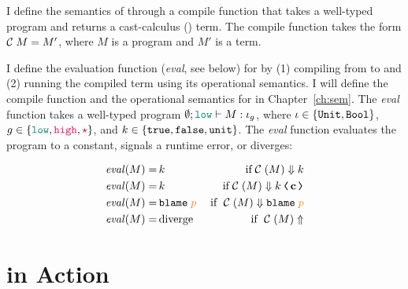 
I define the semantics of \Surface through a compile function that takes a
well-typed \Surface program and returns a cast-calculus (\CC) term. The compile
function takes the form $\mathcal{C}\;{M} = M'$, where $M$ is a \Surface program and
$M'$ is a \CC term.

I define the evaluation function (\textit{eval}, see below) for \Surface by (1)
compiling from \Surface to \CC and (2) running the compiled \CC term using its
operational semantics. I will define the compile function and the operational
semantics for \CC in Chapter~\ref{ch:sem}. The \textit{eval} function takes a
well-typed \Surface program $\emptyset ; \low \vdash M : \iota_g$, where $\iota
\in \{\mathtt{Unit}, \mathtt{Bool}\}$, $g \in \{\low, \high, \unk\}$, and $k \in \{\mathtt{true},
\mathtt{false}, \mathtt{unit}\}$. The \textit{eval} function evaluates the program to a
constant, signals a runtime error, or diverges:

\begin{align*}
  \mathit{eval}(M) =&\,k\;&\text{if}\;\compile(M) \Downarrow k \\
  \mathit{eval}(M) =&\,k\;&\text{if}\;\compile(M) \Downarrow \cccast{k}{\mathbf{c}} \\
  \mathit{eval}(M) =&\,\blame{\bl{p}}\;&\text{if~}\;\compile(M) \Downarrow \blame{\bl{p}} \\
  \mathit{eval}(M) =&\,\text{diverge}\;&\text{if~}\;\compile(M) \Uparrow
\end{align*}

\section{\Surface in Action}
\label{sec:examples}

